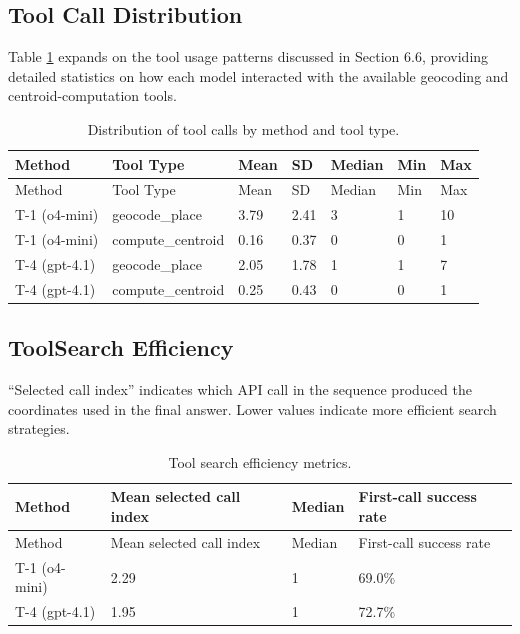 \subsection{Tool Call
Distribution}\label{d.4-tool-call-distribution}

Table \ref{tbl:tool_distribution} expands on the tool usage patterns
discussed in Section 6.6, providing detailed statistics on how each
model interacted with the available geocoding and centroid-computation
tools.

\begin{longtable}[]{@{}lllllll@{}}
\caption{\label{tbl:tool_distribution}Distribution of tool calls by
method and tool type.}\tabularnewline
\toprule\noalign{}
Method & Tool Type & Mean & SD & Median & Min & Max \\
\midrule\noalign{}
\endfirsthead
\toprule\noalign{}
Method & Tool Type & Mean & SD & Median & Min & Max \\
\midrule\noalign{}
\endhead
\bottomrule\noalign{}
\endlastfoot
T-1 (o4-mini) & geocode\_place & 3.79 & 2.41 & 3 & 1 & 10 \\
T-1 (o4-mini) & compute\_centroid & 0.16 & 0.37 & 0 & 0 & 1 \\
T-4 (gpt-4.1) & geocode\_place & 2.05 & 1.78 & 1 & 1 & 7 \\
T-4 (gpt-4.1) & compute\_centroid & 0.25 & 0.43 & 0 & 0 & 1 \\
\end{longtable}

\subsection{ToolSearch
Efficiency}\label{d.5-toolsearch-efficiency}

``Selected call index'' indicates which API call in the sequence
produced the coordinates used in the final answer. Lower values indicate
more efficient search strategies.

\begin{longtable}[]{@{}llll@{}}
\caption{\label{tbl:search_efficiency}Tool search efficiency
metrics.}\tabularnewline
\toprule\noalign{}
Method & Mean selected call index & Median & First-call success rate \\
\midrule\noalign{}
\endfirsthead
\toprule\noalign{}
Method & Mean selected call index & Median & First-call success rate \\
\midrule\noalign{}
\endhead
\bottomrule\noalign{}
\endlastfoot
T-1 (o4-mini) & 2.29 & 1 & 69.0\% \\
T-4 (gpt-4.1) & 1.95 & 1 & 72.7\% \\
\end{longtable}

